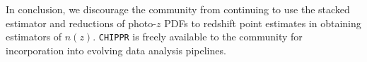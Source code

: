 \documentclass[iop]{emulateapj}
\newcommand{\chippr}{\texttt{CHIPPR} }
\begin{document}
In conclusion, we discourage the community from continuing to use the stacked estimator and reductions of photo-$z$ PDFs to redshift point estimates in obtaining estimators of $n(z)$.  \chippr is freely available to the community for incorporation into evolving data analysis pipelines.  

%
%
%
\end{document}
